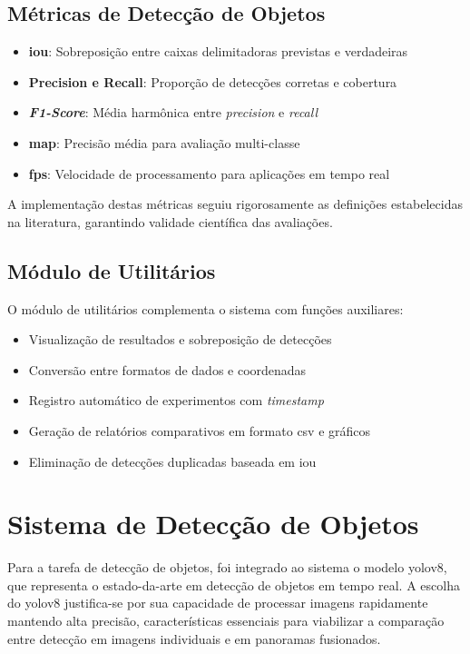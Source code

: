 \subsection*{Métricas de Detecção de Objetos}

\begin{itemize}
    \item \textbf{\gls{iou}}: Sobreposição entre caixas delimitadoras previstas e verdadeiras
    \item \textbf{Precision e Recall}: Proporção de detecções corretas e cobertura
    \item \textbf{\textit{F1-Score}}: Média harmônica entre \textit{precision} e \textit{recall}
    \item \textbf{\gls{map}}: Precisão média para avaliação multi-classe
    \item \textbf{\gls{fps}}: Velocidade de processamento para aplicações em tempo real
\end{itemize}

A implementação destas métricas seguiu rigorosamente as definições estabelecidas na literatura, garantindo validade científica das avaliações.

\subsection{Módulo de Utilitários}

O módulo de utilitários complementa o sistema com funções auxiliares:

\begin{itemize}
    \item Visualização de resultados e sobreposição de detecções
    \item Conversão entre formatos de dados e coordenadas
    \item Registro automático de experimentos com \textit{timestamp}
    \item Geração de relatórios comparativos em formato \gls{csv} e gráficos
    \item Eliminação de detecções duplicadas baseada em \gls{iou}
\end{itemize}

\section{Sistema de Detecção de Objetos}

Para a tarefa de detecção de objetos, foi integrado ao sistema o modelo \gls{yolo}v8, que representa o estado-da-arte em detecção de objetos em tempo real. A escolha do \gls{yolo}v8 justifica-se por sua capacidade de processar imagens rapidamente mantendo alta precisão, características essenciais para viabilizar a comparação entre detecção em imagens individuais e em panoramas fusionados.

